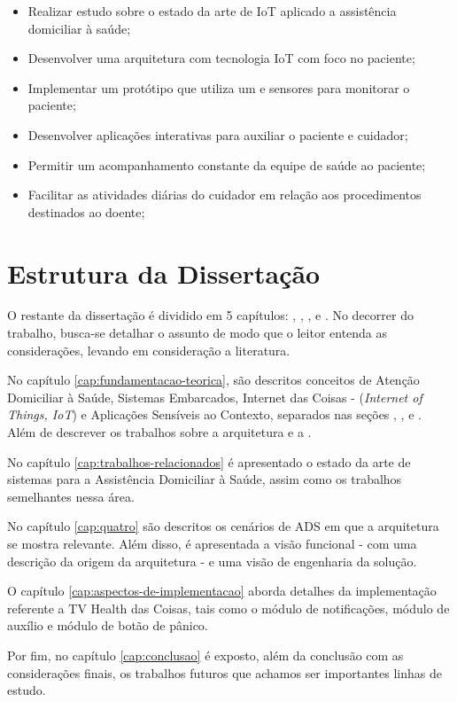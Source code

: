 \begin{itemize}
  \item Realizar estudo sobre o estado da arte de IoT aplicado a assistência domiciliar à saúde;
  \item Desenvolver uma arquitetura com tecnologia IoT com foco no paciente;
  \item Implementar um protótipo que utiliza um \stb[] e sensores para monitorar o paciente;
  \item Desenvolver aplicações interativas para auxiliar o paciente e cuidador;
  \item Permitir um acompanhamento constante da equipe de saúde ao paciente;
  \item Facilitar as atividades diárias do cuidador em relação aos procedimentos
  destinados ao doente;
\end{itemize}

\section{Estrutura da Dissertação}\label{sec:estrutura}

O restante da dissertação é dividido em 5 capítulos: ,
, , 
e . No decorrer do trabalho, busca-se detalhar o assunto de modo que o
leitor entenda as considerações, levando em consideração a literatura. 

No capítulo \ref{cap:fundamentacao-teorica}, são descritos conceitos de Atenção
Domiciliar à Saúde, Sistemas Embarcados, Internet das Coisas -
(\textit{Internet of Things, IoT}) e Aplicações Sensíveis ao Contexto,
separados nas seções , ,
 e . Além de descrever os trabalhos sobre
a arquitetura  e a .

No capítulo \ref{cap:trabalhos-relacionados} é apresentado o estado da arte de
sistemas para a Assistência Domiciliar à Saúde, assim como os trabalhos semelhantes
nessa área.

No capítulo \ref{cap:quatro} são descritos os cenários de ADS em que a arquitetura
se mostra relevante. Além disso, é apresentada a visão funcional - com uma descrição
da origem da arquitetura - e uma visão de engenharia da solução.

O capítulo \ref{cap:aspectos-de-implementacao} aborda detalhes da implementação
referente a TV Health das Coisas, tais como o módulo de notificações, módulo de 
auxílio e módulo de botão de pânico.

Por fim, no capítulo \ref{cap:conclusao} é exposto, além da conclusão com as 
considerações finais, os trabalhos futuros que achamos ser importantes linhas
de estudo.
